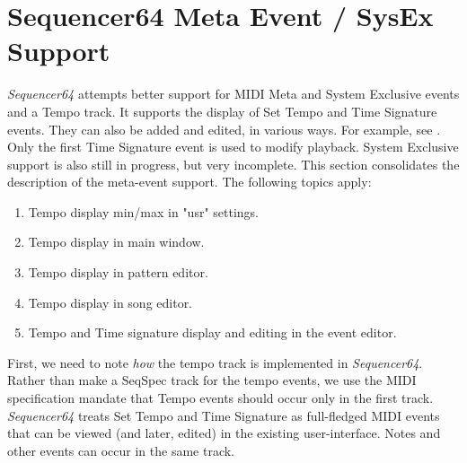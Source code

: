 %
%
%

\section{Sequencer64 Meta Event / SysEx Support}
\label{sec:meta_events}

   \textsl{Sequencer64} attempts better support
   for MIDI Meta and System Exclusive events and a Tempo track.
   It supports the display of Set Tempo and Time Signature events.
   They can also be added and edited, in
   various ways.  For example, see .
   Only the first Time Signature event is used to modify playback.
   System Exclusive support is also still in progress, but very incomplete.
   This section consolidates the description of the meta-event support.
   The following topics apply:

   \begin{enumerate}
      \item Tempo display min/max in "usr" settings.
      \item Tempo display in main window.
      \item Tempo display in pattern editor.
      \item Tempo display in song editor.
      \item Tempo and Time signature display and editing in the event editor.
   \end{enumerate}

   First, we need to note \textsl{how} the tempo track is
   implemented in \textsl{Sequencer64}.  Rather than make a SeqSpec track for
   the tempo events, we use the MIDI specification mandate that
   Tempo events should occur only in the first track.
   \textsl{Sequencer64} treats Set Tempo and Time Signature as full-fledged
   MIDI events that can be viewed (and later, edited) in the existing
   user-interface.  Notes and other events can occur in the same
   track.

